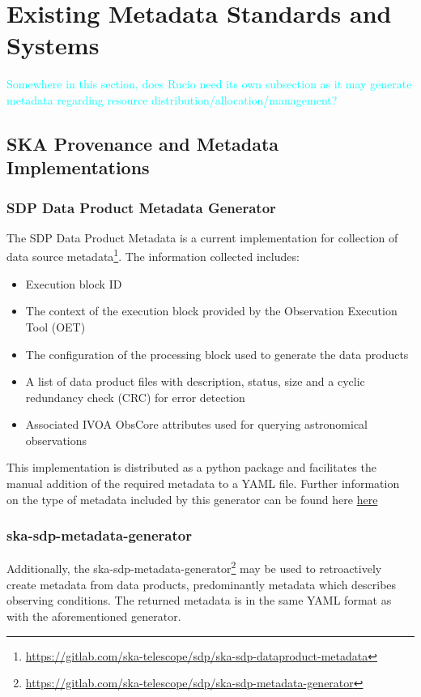 \section{Existing Metadata Standards and Systems}\label{sec:exist_mod}
\textcolor{cyan}{Somewhere in this section, does Rucio need its own subsection as it may generate metadata regarding resource distribution/allocation/management?  
}
\subsection{SKA Provenance and Metadata Implementations}

\subsubsection{SDP Data Product Metadata Generator}

The SDP Data Product Metadata is a current implementation for collection of data source metadata\footnote{\url{https://gitlab.com/ska-telescope/sdp/ska-sdp-dataproduct-metadata}}.
The information collected includes:

\begin{itemize}
    \item Execution block ID
    \item The context of the execution block provided by the Observation Execution Tool (OET)
    \item The configuration of the processing block used to generate the data products
    \item A list of data product files with description, status, size and a cyclic redundancy check (CRC) for error detection
    \item Associated IVOA ObsCore attributes used for querying astronomical observations
\end{itemize}

This implementation is distributed as a python package and facilitates the manual addition of the required metadata to a YAML file. 
Further information on the type of metadata included by this generator can be found here \href{https://confluence.skatelescope.org/pages/viewpage.action?spaceKey=SWSI&title=ADR-55+Definition+of+metadata+for+data+management+at+AA0.5}{here}

\subsubsection{ska-sdp-metadata-generator}

Additionally, the ska-sdp-metadata-generator\footnote{\url{https://gitlab.com/ska-telescope/sdp/ska-sdp-metadata-generator}} may be used to retroactively create metadata from data products, predominantly metadata which describes observing conditions.
The returned metadata is in the same YAML format as with the aforementioned generator. 

